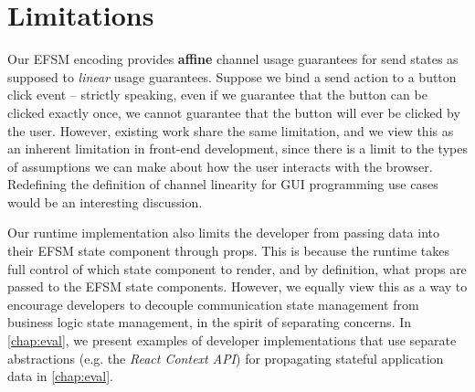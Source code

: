 \section{Limitations}
\label{section:reactlimitations}

Our EFSM encoding provides \textbf{affine} channel
usage guarantees for send states as supposed to \textit{linear} usage
guarantees. Suppose we bind a send action to a
button click event -- strictly speaking,
even if we guarantee that the button can be clicked exactly once,
we cannot guarantee that the button will ever be clicked by the user.
However, existing work \cite{PureScript2019,MVU2020} 
share the same limitation, and we view this as an
inherent limitation in front-end development, since there is
a limit to the types of assumptions we can make about how the
user interacts with the browser.
Redefining the definition of channel linearity 
for GUI programming use cases
would be an interesting discussion.

Our runtime implementation also limits the developer from
passing data into their EFSM state component through props.
This is because the runtime takes full control of which
state component to render, and by definition, what props 
are passed to the EFSM state components.
However, we equally view this as a way to encourage developers
to decouple communication state management from
business logic state management, in the spirit
of separating concerns.
In \cref{chap:eval},
we present examples of developer implementations
that use separate abstractions (e.g. the \textit{React Context API}) 
for propagating 
stateful application data in \cref{chap:eval}.